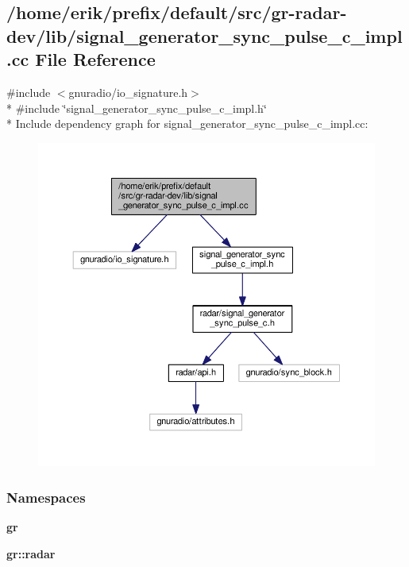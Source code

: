 \subsection{/home/erik/prefix/default/src/gr-\/radar-\/dev/lib/signal\+\_\+generator\+\_\+sync\+\_\+pulse\+\_\+c\+\_\+impl.cc File Reference}
\label{signal__generator__sync__pulse__c__impl_8cc}
{\ttfamily \#include $<$gnuradio/io\+\_\+signature.\+h$>$}\\*
{\ttfamily \#include \char`\"{}signal\+\_\+generator\+\_\+sync\+\_\+pulse\+\_\+c\+\_\+impl.\+h\char`\"{}}\\*
Include dependency graph for signal\+\_\+generator\+\_\+sync\+\_\+pulse\+\_\+c\+\_\+impl.\+cc\+:
\nopagebreak
\begin{figure}[H]
\begin{center}
\leavevmode
\includegraphics[width=350pt]{d2/d9a/signal__generator__sync__pulse__c__impl_8cc__incl}
\end{center}
\end{figure}
\subsubsection*{Namespaces}
\begin{DoxyCompactItemize}
\item 
 {\bf gr}
\item 
 {\bf gr\+::radar}
\end{DoxyCompactItemize}
